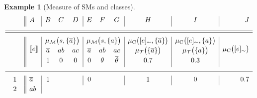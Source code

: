 \documentclass[a4paper]{article}
\newtheorem{example}{Example}
\newtheorem{example}{Example}
\newcommand{\at}[1]{\ensuremath{\!\del{#1}}}        %
\newcommand{\cla}[1]{\ensuremath{{\cal #1}}}        %
\newcommand{\co}[1]{\ensuremath{\overline{#1}}}     %
\newcommand{\TCHOICEset}{\ensuremath{\cla{T}}}
\newcommand{\MODELset}{\ensuremath{\cla{M}}}
\newcommand{\pwT}{\ensuremath{\mu_{\TCHOICEset}}}
\newcommand{\pwt}[1]{\ensuremath{\pwT\at{#1}}}
\newcommand{\pwM}{\ensuremath{\mu_{\MODELset}}}
\newcommand{\pwm}[1]{\ensuremath{\pwM\at{#1}}}
\newcommand{\pwC}{\ensuremath{\mu_{\textrm{C}}}}
\newcommand{\pwc}[1]{\ensuremath{\pwC\at{#1}}}
\newcommand{\stablecore}[1]{\ensuremath{\left\llbracket #1 \right\rrbracket}}
\newcommand{\class}[1]{\ensuremath{[{#1}]_{\sim}}}
\newcommand{\franc}[1]{{\color{green!30!black}#1}}
\begin{document}
\franc{
  \begin{example}[Measure of \aclp{SM} and classes]\label{ex:measures.sm}\em
      \begin{equation*}
          \begin{array}{c||l|ccc|ccc|c|c|r}
                &
              A & B                                         & C      & D           & E & F & G & H & I & J
              \\[3pt]
              \hline
              \hline
              \multirow{3}{*}{\phantom{2em}}
                & \multirow{3}{*}{\stablecore{e}}
                & \multicolumn{3}{c|}{\pwm{s,\set{\co{a}}}}
                & \multicolumn{3}{c|}{\pwm{s,\set{a}}}
                & \pwc{\class{e},\set{\co{a}}}
                & \pwc{\class{e},\set{a}}
                & \multirow{3}{*}{\pwc{\class{e}}}
              \\[2pt]
                &
                & \co{a}                                    & ab     & ac
                & \co{a}                                    & ab     & ac
                & \pwt{\set{\co{a}}}
                & \pwt{\set{a}}
                &
              \\[2pt]
                &
                & 1                                         & 0      & 0
                & 0                                         & \theta & \co{\theta}
                & 0.7
                & 0.3
                &
              \\[3pt]
              \hline
              1
                & \co{a}
                & 1                                         &        &
                & 0                                         &        &
                & 1
                & 0
                & 0.7
              \\[2pt]
              2
                & ab

\end{array}
\end{equation*}
\end{example}}
\end{document}
